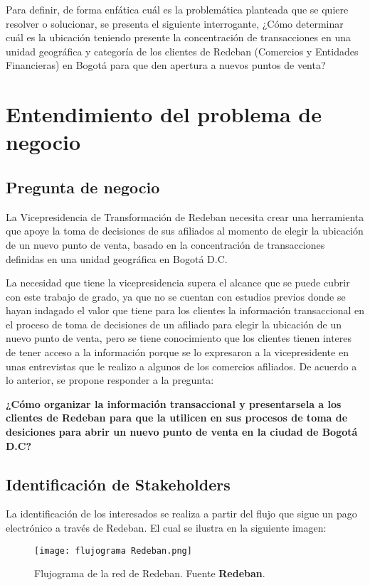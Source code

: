\documentclass[a4paper]{article}
\begin{document}
Para definir, de forma enfática cuál es la problemática planteada que se quiere resolver o solucionar, se presenta el siguiente interrogante, ¿Cómo determinar cuál es la ubicación teniendo presente la concentración de transacciones en una unidad geográfica y categoría de los clientes de Redeban (Comercios y Entidades Financieras)  en Bogotá para que den apertura a nuevos puntos de venta?

\section{Entendimiento del problema de negocio}
\subsection{Pregunta de negocio}

La Vicepresidencia de Transformación de Redeban necesita crear una herramienta que apoye la toma de decisiones de sus afiliados al momento de elegir la ubicación de un nuevo punto de venta, basado en la concentración de transacciones definidas en una unidad geográfica en Bogotá D.C. 

La necesidad que tiene la vicepresidencia supera el alcance que se puede cubrir con este trabajo de grado, ya que no se cuentan con estudios previos donde se hayan indagado el valor que tiene para los clientes la información transaccional en el proceso de toma de decisiones de un afiliado para elegir la ubicación de un nuevo punto de venta, pero se tiene conocimiento que los clientes tienen interes de tener acceso a la información porque se lo expresaron a la vicepresidente en unas entrevistas que le realizo a algunos de los comercios afiliados. De acuerdo a lo anterior, se propone responder a la pregunta:

\textbf{¿Cómo organizar la información transaccional y presentarsela a los clientes de Redeban para que la utilicen en sus procesos de toma de desiciones para abrir un nuevo punto de venta en la ciudad de Bogotá D.C?}

\subsection{Identificación de Stakeholders}

La identificación de los interesados se realiza a partir del flujo que sigue un pago electrónico a través de Redeban. El cual se ilustra en la siguiente imagen:

\begin{figure}[h]
    \centering
    \texttt{[image: flujograma Redeban.png]}
    \caption{Flujograma de la red de Redeban. Fuente \textbf{Redeban}.}
    \label{fig:flujograma}
\end{figure}
\end{document}
